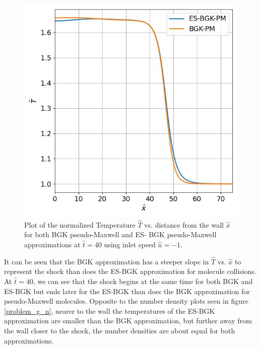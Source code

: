 \documentclass[a4paper]{article}
\begin{document}
\clearpage
\begin{figure}[hbt!]
    \centering
    \includegraphics[width=14cm]{plots/problem_g_T.png}
    \caption{\centering Plot of the normalized Temperature $\hat{T}$ vs. distance from the wall $\hat{x}$ for both BGK pseudo-Maxwell and ES- BGK pseudo-Maxwell approximations at $\hat{t} = 40$ using inlet speed $\hat{u} = -1$.}
    \label{problem_g_T}
\end{figure}
It can be seen that the BGK approximation has a steeper slope in $\hat{T}$ vs. $\hat{x}$ to represent the shock than does the ES-BGK approximation for molecule collisions. At $\hat{t} = 40$, we can see that the shock begins at the same time for both BGK and ES-BGK but ends later for the ES-BGK than does the BGK approximation for pseudo-Maxwell molecules. Opposite to the number density plots seen in figure \ref{problem_g_n}, nearer to the wall the temperatures of the ES-BGK approximation are smaller than the BGK approximation, but further away from the wall closer to the shock, the number densities are about equal for both approximations. 
\clearpage
\end{document}
